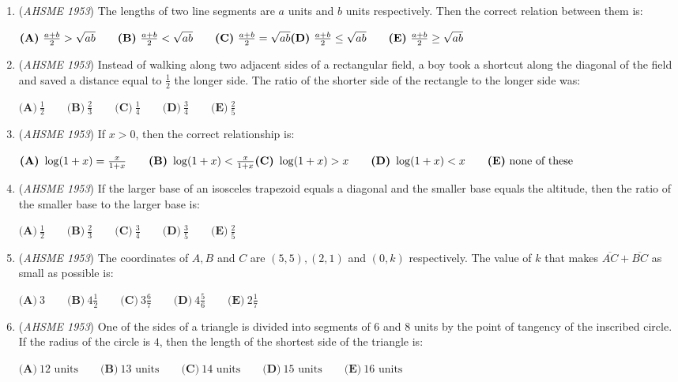 \begin{enumerate}
 $\textbf{(A)}\ x^2-10x+9=0 \qquad \textbf{(B)}\ x^2+10x+9=0 \qquad \textbf{(C)}\ x^2-10x+16=0\\  \textbf{(D)}\ x^2-8x-9=0\qquad \textbf{(E)}\ \text{none of these}$


	\item (\textit{AHSME 1953}) The lengths of two line segments are $a$ units and $b$ units respectively. Then the correct relation between them is: 


 $\textbf{(A)}\ \frac{a+b}{2} > \sqrt{ab} \qquad \textbf{(B)}\ \frac{a+b}{2} < \sqrt{ab} \qquad \textbf{(C)}\ \frac{a+b}{2}=\sqrt{ab}\\ \textbf{(D)}\ \frac{a+b}{2}\leq\sqrt{ab}\qquad \textbf{(E)}\ \frac{a+b}{2}\geq\sqrt{ab}$


	\item (\textit{AHSME 1953}) Instead of walking along two adjacent sides of a rectangular field, a boy took a shortcut along the diagonal of the field and 
saved a distance equal to $\frac{1}{2}$ the longer side. The ratio of the shorter side of the rectangle to the longer side was: 


 $\textbf{(A)}\ \frac{1}{2} \qquad \textbf{(B)}\ \frac{2}{3} \qquad \textbf{(C)}\ \frac{1}{4} \qquad \textbf{(D)}\ \frac{3}{4}\qquad \textbf{(E)}\ \frac{2}{5}$


	\item (\textit{AHSME 1953}) If $x>0$, then the correct relationship is: 


 $\textbf{(A)}\ \log (1+x) = \frac{x}{1+x} \qquad \textbf{(B)}\ \log (1+x) < \frac{x}{1+x} \\  \textbf{(C)}\ \log(1+x) > x\qquad \textbf{(D)}\ \log (1+x) < x\qquad \textbf{(E)}\ \text{none of these}$


	\item (\textit{AHSME 1953}) If the larger base of an isosceles trapezoid equals a diagonal and the smaller base equals the altitude, 
then the ratio of the smaller base to the larger base is: 


 $\textbf{(A)}\ \frac{1}{2} \qquad \textbf{(B)}\ \frac{2}{3} \qquad \textbf{(C)}\ \frac{3}{4} \qquad \textbf{(D)}\ \frac{3}{5}\qquad \textbf{(E)}\ \frac{2}{5}$


	\item (\textit{AHSME 1953}) The coordinates of $A,B$ and $C$ are $(5,5),(2,1)$ and $(0,k)$ respectively. 
The value of $k$ that makes $\overline{AC}+\overline{BC}$ as small as possible is: 


 $\textbf{(A)}\ 3 \qquad \textbf{(B)}\ 4\frac{1}{2} \qquad \textbf{(C)}\ 3\frac{6}{7} \qquad \textbf{(D)}\ 4\frac{5}{6}\qquad \textbf{(E)}\ 2\frac{1}{7}$


	\item (\textit{AHSME 1953}) One of the sides of a triangle is divided into segments of $6$ and $8$ units by the point of tangency of the inscribed circle. 
If the radius of the circle is $4$, then the length of the shortest side of the triangle is: 


 $\textbf{(A)}\ 12\text{ units} \qquad \textbf{(B)}\ 13\text{ units} \qquad \textbf{(C)}\ 14\text{ units} \qquad \textbf{(D)}\ 15\text{ units}\qquad \textbf{(E)}\ 16\text{ units}$


\end{enumerate}